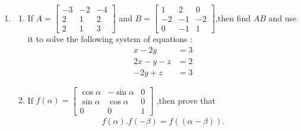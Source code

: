 \documentclass[12pt,-letter paper]{article}
\providecommand{\myvec}[1]{\ensuremath{\begin{bmatrix}#1\end{bmatrix}}}
\providecommand{\brak}[1]{\ensuremath{\left(#1\right)}}
\begin{document}
\begin{enumerate}
\item\begin{enumerate}[label=(\alph*)]
    \item If $A=\myvec{ -3 & -2 & -4\\2 & 1 & 2\\2 & 1 & 3}$
and $B =\myvec{  1 & 2 & 0\\-2 & -1 & -2\\0 & -1 & 1}$,then find $AB$ and use it to solve the following system of equations :
\begin{align} x - 2y &= 3\\2x - y - z &= 2\\-2y + z &= 3\end{align}
\item If $f\brak{\alpha}=\myvec{
    \cos\alpha & -\sin\alpha & 0\\
    \sin\alpha & \cos\alpha & 0\\
    0 & 0 & 1}$
 ,then prove that\begin{align}
      f\brak{\alpha}.f\brak{-\beta} =f\brak{(\alpha - \beta)}.
 \end{align}
\end{enumerate}
 \end{enumerate}
\end{document}
